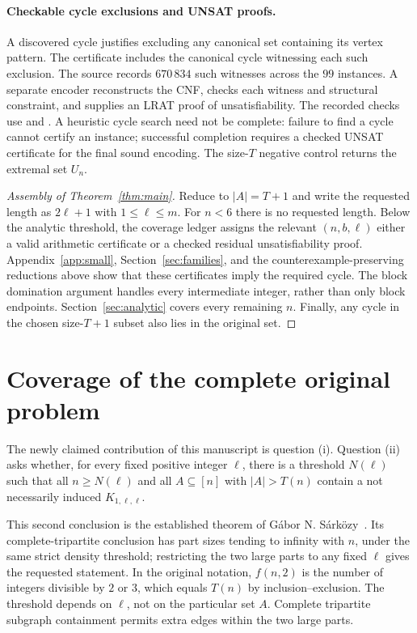 \paragraph{Checkable cycle exclusions and UNSAT proofs.}
A discovered cycle justifies excluding any canonical set containing its vertex pattern. The certificate includes the canonical cycle witnessing each such exclusion. The source records $670\,834$ such witnesses across the $99$ instances. A separate encoder reconstructs the CNF, checks each witness and structural constraint, and supplies an LRAT proof of unsatisfiability. The recorded checks use  and . A heuristic cycle search need not be complete: failure to find a cycle cannot certify an instance; successful completion requires a checked UNSAT certificate for the final sound encoding. The size-$T$ negative control returns the extremal set $U_n$.

\begin{proof}[Assembly of Theorem~\ref{thm:main}]
Reduce to $|A|=T+1$ and write the requested length as $2\ell+1$ with $1\le\ell\le m$. For $n<6$ there is no requested length. Below the analytic threshold, the coverage ledger assigns the relevant $(n,b,\ell)$ either a valid arithmetic certificate or a checked residual unsatisfiability proof. Appendix~\ref{app:small}, Section~\ref{sec:families}, and the counterexample-preserving reductions above show that these certificates imply the required cycle. The block domination argument handles every intermediate integer, rather than only block endpoints. Section~\ref{sec:analytic} covers every remaining $n$. Finally, any cycle in the chosen size-$T+1$ subset also lies in the original set.
\end{proof}

\section{Coverage of the complete original problem}\label{sec:both}
The newly claimed contribution of this manuscript is question (i). Question (ii) asks whether, for every fixed positive integer $\ell$, there is a threshold $N(\ell)$ such that all $n\ge N(\ell)$ and all $A\subseteq[n]$ with $|A|>T(n)$ contain a not necessarily induced $K_{1,\ell,\ell}$.

This second conclusion is the established theorem of G\'abor N. S\'ark\"ozy~\cite{S99}. Its complete-tripartite conclusion has part sizes tending to infinity with $n$, under the same strict density threshold; restricting the two large parts to any fixed $\ell$ gives the requested statement. In the original notation, $f(n,2)$ is the number of integers divisible by $2$ or $3$, which equals $T(n)$ by inclusion--exclusion. The threshold depends on $\ell$, not on the particular set $A$. Complete tripartite subgraph containment permits extra edges within the two large parts.

